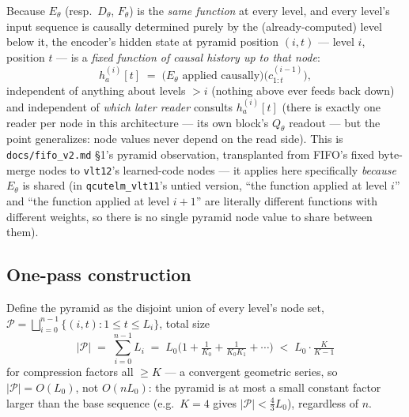 \documentclass[11pt]{article}
\begin{document}
Because $E_\theta$ (resp.\ $D_\theta$, $F_\theta$) is the \emph{same
function} at every level, and every level's input sequence is causally
determined purely by the (already-computed) level below it, the encoder's
hidden state at pyramid position $(i, t)$ — level $i$, position $t$ — is a
\emph{fixed function of causal history up to that node}:
\begin{equation}
  h^{(i)}_a[t] \;=\; \big(E_\theta \text{ applied causally}\big)\big(c^{(i-1)}_{1:t}\big),
  \label{eq:node-fn}
\end{equation}
independent of anything about levels $>i$ (nothing above ever feeds
back down) and independent of \emph{which later reader} consults
$h^{(i)}_a[t]$ (there is exactly one reader per node in this
architecture — its own block's $Q_\theta$ readout — but the point
generalizes: node values never depend on the read side). This is
\texttt{docs/fifo\_v2.md} \S1's pyramid observation, transplanted from
FIFO's fixed byte-merge nodes to \texttt{vlt12}'s learned-code nodes —
it applies here specifically \emph{because} $E_\theta$ is shared (in
\texttt{qcutelm\_vlt11}'s untied version, ``the function applied at level
$i$'' and ``the function applied at level $i{+}1$'' are literally
different functions with different weights, so there is no single
pyramid node value to share between them).

\subsection{One-pass construction}

Define the pyramid as the disjoint union of every level's node set,
$\mathcal{P} = \bigsqcup_{i=0}^{n-1} \{(i, t) : 1 \le t \le L_i\}$, total
size
\begin{equation}
  |\mathcal{P}| \;=\; \sum_{i=0}^{n-1} L_i \;=\; L_0 \Big(1 + \tfrac{1}{K_0}
    + \tfrac{1}{K_0 K_1} + \cdots\Big) \;<\; L_0 \cdot \tfrac{K}{K-1}
  \label{eq:pyramid-size}
\end{equation}
for compression factors all $\ge K$ — a convergent geometric series, so
$|\mathcal{P}| = O(L_0)$, not $O(n L_0)$: the pyramid is at most a small
constant factor larger than the base sequence (e.g.\ $K{=}4$ gives
$|\mathcal{P}| < \tfrac{4}{3} L_0$), regardless of $n$.
\end{document}
